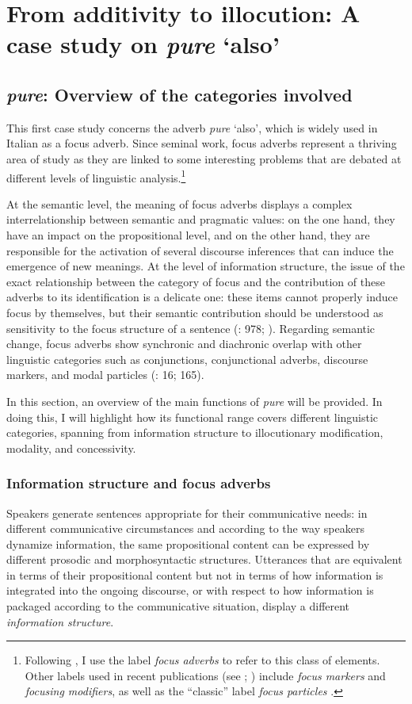 \chapter{From additivity to illocution: A case study on \textit{pure} ‘also’}\label{sec:6}
\hypertarget{Toc124860647}{}\section{\textit{pure}: Overview of the categories involved}
\hypertarget{Toc124860648}{}
This first case study concerns the adverb \textit{pure} ‘also’, which is widely used in Italian as a focus adverb. Since  seminal work, focus adverbs represent a thriving area of study as they are linked to some interesting problems that are debated at different levels of linguistic analysis.\footnote{Following \citet{Cesare2017}, I use the label \textit{focus adverbs} to refer to this class of elements. Other labels used in recent publications (see \citealt{Cesare2015}; \citealt{CesareAndorno2017}) include \textit{focus markers} and \textit{focusing modifiers}, as well as the “classic” label \textit{focus particles} \citep{König1991}.}

At the semantic level, the meaning of focus adverbs displays a complex interrelationship between semantic and pragmatic values: on the one hand, they have an impact on the propositional level, and on the other hand, they are responsible for the activation of several discourse inferences that can induce the emergence of new meanings. At the level of information structure, the issue of the exact relationship between the category of focus and the contribution of these adverbs to its identification is a delicate one: these items cannot properly induce focus by themselves, but their semantic contribution should be understood as sensitivity to the focus structure of a sentence (\citealt{König1993}: 978; \citealt{Cesare2010}). Regarding semantic change, focus adverbs show synchronic and diachronic overlap with other linguistic categories such as conjunctions, conjunctional adverbs, discourse markers, and modal particles (\citealt{König1991}: 16; 165).

In this section, an overview of the main functions of \textit{pure} will be provided. In doing this, I will highlight how its functional range covers different linguistic categories, spanning from information structure to illocutionary modification, modality, and concessivity.

\subsection{Information structure and focus adverbs}
\hypertarget{Toc124860649}{}
Speakers generate sentences appropriate for their communicative needs: in different communicative circumstances and according to the way speakers dy\-na\-mize information, the same propositional content can be expressed by different prosodic and morphosyntactic structures. Utterances that are equivalent in terms of their propositional content but not in terms of how information is integrated into the ongoing discourse, or with respect to how information is packaged according to the communicative situation, display a different \textit{information structure}.

